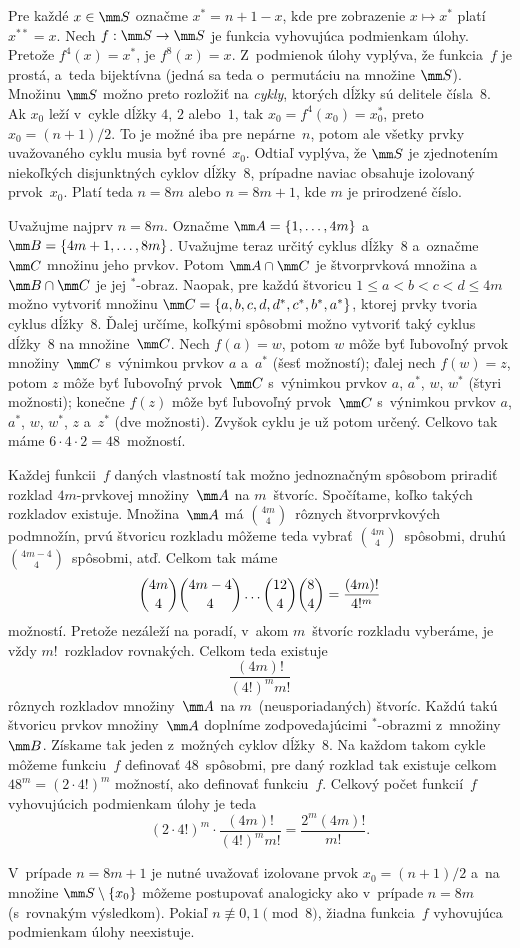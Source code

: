 {%
Pre každé $x\in\mm S$ označme $x^{*}=n+1-x$, kde pre zobrazenie
\hbox{$x\mapsto x^{*}$} platí $x^{**}=x$. Nech \hbox{$f:\mm S\to\mm S$} je
funkcia vyhovujúca podmienkam úlohy. Pretože $f^4(x)=x^{*}$, je
$f^8(x)=x$. Z~podmienok úlohy vyplýva, že funkcia~$f$ je prostá,
a~teda bijektívna (jedná sa teda o~permutáciu na množine $\mm
S$). Množinu $\mm S$ možno preto rozložiť na {\it cykly}, ktorých
dĺžky sú delitele čísla~$8$. Ak $x_0$ leží v~cykle dĺžky
$4$, $2$ alebo~$1$, tak $x_0=f^4(x_0)=x_0^{*}$, preto
$x_0=(n+1)/2$. To je možné iba pre nepárne~$n$, potom ale
všetky prvky uvažovaného cyklu musia byť rovné~$x_0$. Odtiaľ
vyplýva, že $\mm S$ je zjednotením niekoľkých disjunktných cyklov
dĺžky~$8$, prípadne naviac obsahuje izolovaný prvok~$x_0$. Platí
teda $n=8m$ alebo $n=8m+1$, kde $m$ je prirodzené číslo.

\smallskip
Uvažujme najprv $n=8m$. Označme $\mm A=\{1,\dots ,4m\}$
a~$\mm B=\{{4m+1},\dots ,8m\}$. Uvažujme teraz určitý cyklus
dĺžky~$8$ a~označme~$\mm C$ množinu jeho prvkov. Potom $\mm A\cap
\mm C$ je štvorprvková množina a~$\mm B\cap \mm C$ je jej
${}^{*}$-obraz. Naopak, pre každú štvoricu $1\leq a<b<c<d\leq
4m$ možno vytvoriť množinu $\mm
C=\{a,b,c,d,d^{*},c^{*},b^{*},a^{*}\}$, ktorej prvky tvoria cyklus
dĺžky~$8$. Ďalej určíme, koľkými spôsobmi možno vytvoriť taký cyklus
dĺžky~$8$ na množine~$\mm C$. Nech $f(a)=w$, potom $w$ môže byť
ľubovoľný prvok množiny~$\mm C$ s~výnimkou prvkov $a$ a~$a^{*}$
(šesť možností); ďalej nech $f(w)=z$, potom $z$ môže byť ľubovoľný
prvok~$\mm C$ s~výnimkou prvkov $a$, $a^{*}$, $w$, $w^{*}$ (štyri
možnosti); konečne $f(z)$ môže byť ľubovoľný prvok~$\mm C$
s~výnimkou prvkov $a$, $a^{*}$, $w$, $w^{*}$, $z$ a~$z^{*}$ (dve
možnosti). Zvyšok cyklu je už potom určený. Celkovo tak máme
$6\cdot 4\cdot 2=48$~možností.

Každej funkcii~$f$ daných vlastností tak možno jednoznačným spôsobom priradiť
rozklad \hbox{$4m$-prvkovej} množiny~$\mm A$ na $m$~štvoríc. Spočítame,
koľko takých rozkladov existuje. Množina~$\mm A$ má
$\binom{4m}4$~rôznych štvorprvkových podmnožín, prvú štvoricu
rozkladu môžeme teda vybrať $\binom{4m}4$~spôsobmi, druhú
$\binom{4m-4}4$~spôsobmi, atď. Celkom tak máme
$$
\binom{4m}4\binom{4m-4}4\dots\binom{12}4\binom84={(4m)!\over4!^m}
$$
možností. Pretože nezáleží na poradí, v~akom $m$~štvoríc rozkladu
vyberáme, je vždy $m!$~rozkladov rovnakých. Celkom teda existuje
$$
\frac{(4m)!}{(4!)^mm!}
$$
rôznych rozkladov množiny~$\mm A$ na $m$~(neusporiadaných) štvoríc.
Každú takú štvoricu prvkov množiny~$\mm A$ doplníme
zodpovedajúcimi ${}^{*}$-obrazmi z~množiny~$\mm B$. Získame tak jeden
z~možných cyklov dĺžky~$8$. Na každom takom cykle môžeme funkciu~$f$
definovať $48$~spôsobmi, pre daný rozklad tak existuje celkom
$48^m=(2\cdot 4!)^m$ možností, ako definovať funkciu~$f$.
Celkový počet funkcií~$f$ vyhovujúcich podmienkam úlohy je teda
$$
(2\cdot 4!)^m\cdot \frac{(4m)!}{(4!)^mm!}=\frac{2^{m}(4m)!}{m!}.
$$

\smallskip
V~prípade $n=8m+1$ je nutné uvažovať izolovane prvok
$x_0=(n+1)/2$ a~na množine $\mm S\setminus \{x_0\}$ môžeme
postupovať analogicky ako v~prípade $n=8m$ (s~rovnakým výsledkom).
Pokiaľ $n\not\equiv 0, 1 \pmod 8$, žiadna funkcia~$f$ vyhovujúca
podmienkam úlohy neexistuje.}

